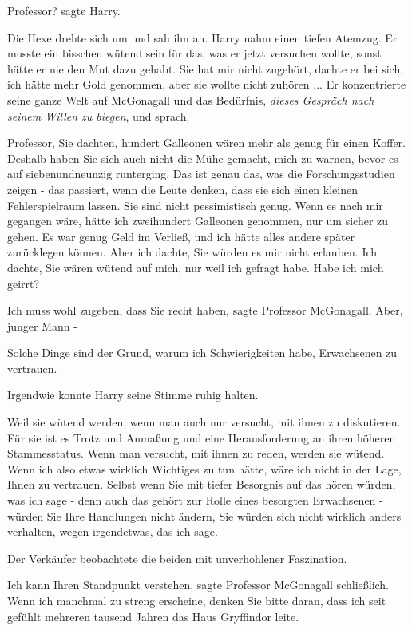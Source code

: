 \glqq{}Professor?\grqq{} sagte Harry.

Die Hexe drehte sich um und sah ihn an. Harry nahm einen tiefen Atemzug. Er
musste ein bisschen wütend sein für das, was er jetzt versuchen wollte, sonst
hätte er nie den Mut dazu gehabt. Sie hat mir nicht zugehört, dachte er bei
sich, ich hätte mehr Gold genommen, aber sie wollte nicht zuhören ... Er
konzentrierte seine ganze Welt auf McGonagall und das Bedürfnis, \emph{dieses
Gespräch nach seinem Willen zu biegen}, und sprach.

\glqq{}Professor, Sie dachten, hundert Galleonen wären mehr als genug für einen
Koffer. Deshalb haben Sie sich auch nicht die Mühe gemacht, mich zu warnen,
bevor es auf siebenundneunzig runterging. Das ist genau das, was die
Forschungsstudien zeigen - das passiert, wenn die Leute denken, dass sie sich
einen kleinen Fehlerspielraum lassen. Sie sind nicht pessimistisch genug. Wenn
es nach mir gegangen wäre, hätte ich zweihundert Galleonen genommen, nur um
sicher zu gehen. Es war genug Geld im Verließ, und ich hätte alles andere später
zurücklegen können. Aber ich dachte, Sie würden es mir nicht erlauben. Ich
dachte, Sie wären wütend auf mich, nur weil ich gefragt habe. Habe ich mich
geirrt?\grqq{}

\glqq{}Ich muss wohl zugeben, dass Sie recht haben\grqq{}, sagte Professor
McGonagall. \glqq{}Aber, junger Mann -\grqq{}

\glqq{}Solche Dinge sind der Grund, warum ich Schwierigkeiten habe, Erwachsenen
zu vertrauen.\grqq{}

Irgendwie konnte Harry seine Stimme ruhig halten.

\glqq{}Weil sie wütend werden, wenn man auch nur versucht, mit ihnen zu
diskutieren. Für sie ist es Trotz und Anmaßung und eine Herausforderung an ihren
höheren Stammesstatus. Wenn man versucht, mit ihnen zu reden, werden sie wütend.
Wenn ich also etwas wirklich Wichtiges zu tun hätte, wäre ich nicht in der Lage,
Ihnen zu vertrauen. Selbst wenn Sie mit tiefer Besorgnis auf das hören würden,
was ich sage - denn auch das gehört zur Rolle eines besorgten Erwachsenen -
würden Sie Ihre Handlungen nicht ändern, Sie würden sich nicht wirklich anders
verhalten, wegen irgendetwas, das ich sage.\grqq{}

Der Verkäufer beobachtete die beiden mit unverhohlener Faszination.

\glqq{}Ich kann Ihren Standpunkt verstehen\grqq{}, sagte Professor McGonagall
schließlich. \glqq{}Wenn ich manchmal zu streng erscheine, denken Sie bitte
daran, dass ich seit gefühlt mehreren tausend Jahren das Haus Gryffindor
leite.\grqq{}

